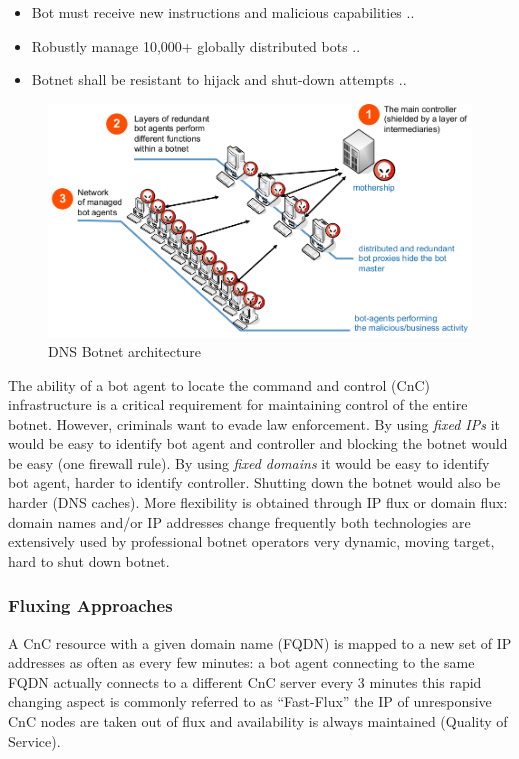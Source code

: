 \documentclass[11pt,oneside,a4paper]{article}
\begin{document}
\vspace{-\topsep}
\begin{itemize}
	\setlength{\itemsep}{0pt}
	\setlength{\parskip}{0pt}
	\item Bot must receive new instructions and malicious capabilities ..
	\item Robustly manage 10,000+ globally distributed bots ..
	\item Botnet shall be resistant to hijack and shut-down attempts ..
\end{itemize}
\vspace{-\topsep}

\begin{figure}[hb]
	\centering
	\includegraphics[width=0.7\linewidth]{figures/dns_botnet_architecture}
	\caption{DNS Botnet architecture}
	\label{fig:dnsbotnetarchitecture}
\end{figure}

\noindent The ability of a bot agent to locate the command and control (CnC) infrastructure
is a critical requirement for maintaining control of the entire botnet. However, criminals want to evade law enforcement. By using \textit{fixed IPs} it would be easy to identify bot agent and controller and blocking the botnet would be easy (one firewall rule). By using \textit{fixed domains} it would be easy to identify bot agent, harder to identify controller. Shutting down the botnet would also be harder (DNS caches). More flexibility is obtained through IP flux or domain flux: domain names and/or IP addresses change frequently both technologies are extensively used by professional botnet operators very dynamic, moving target, hard to shut down botnet.

\subsubsection{Fluxing Approaches}

A CnC resource with a given domain name (FQDN) is mapped to a new set of IP addresses as often as every few minutes: a bot agent connecting to the same FQDN actually connects to a different CnC server every 3 minutes this rapid changing aspect is commonly referred to as “Fast-Flux” the IP of unresponsive CnC nodes are taken out of flux and availability is always maintained (Quality of Service).
\end{document}
